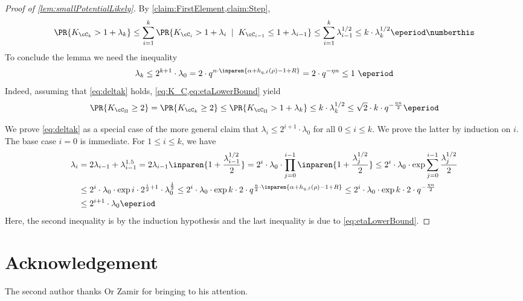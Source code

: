 \documentclass[11pt]{article}
\begin{document}
\begin{proof}[Proof of \cref{lem:smallPotentialLikely}]
    By \cref{claim:FirstElement,claim:Step},
    \begin{align*}
        \PR{K_{\cC_k} > 1+\lambda_k} \le \sum_{i=1}^k \PR{K_{\cC_i} > 1+\lambda _i \;\mid\; K_{\cC_{i-1}}\le 1+\lambda_{i-1}} \le \sum_{i=1}^k \lambda_{i-1}^{1/2} \le k\cdot \lambda_k^{1/2}\eperiod \numberthis \label{eq:K_C}
    \end{align*}
    To conclude the lemma we need the inequality
    \begin{equation}\label{eq:deltak}
        \lambda_k \le 2^{k+1}\cdot \lambda_0 = 2\cdot q^{n\cdot\inparen{\alpha + h_{q,\ell}(\rho)-1+R}} = 2 \cdot q^{-\eta n}\le 1\ \eperiod
    \end{equation}
    Indeed, assuming that \cref{eq:deltak} holds, \cref{eq:K_C,eq:etaLowerBound} yield
    $$\PR{K_{\cC_\Pi} \ge 2} = \PR{K_{\cC_k} \ge 2} \le \PR{K_{\cC_\Pi} > 1+\lambda_k} \le k\cdot \lambda_k^{1/2} \le \sqrt2\cdot k\cdot q^{-\frac {\eta n}2}\eperiod$$
    
    We prove \cref{eq:deltak} as a special case of the more general claim that $\lambda_i \le 2^{i+1}\cdot \lambda_0$ for all $0\le i\le k$. We prove the latter by induction on $i$. The base case $i=0$ is immediate. For $1\le i\le k$, we have
    \begin{align*}\lambda_i &= 2\lambda_{i-1} + \lambda_{i-1}^{1.5} = 2\lambda_{i-1}\inparen{1 + \frac{\lambda_{i-1}^{1/2}}{2}} = 2^i\cdot \lambda_0\cdot\prod_{j=0}^{i-1}\inparen{1+\frac{\lambda_j^{1/2}}2} \leq 2^i\cdot \lambda_0\cdot \exp{\sum_{j=0}^{i-1} \frac{\lambda_j^{1/2}}2} \\
    &\le 2^i\cdot \lambda_0\cdot \exp{i\cdot 2^{\frac {i}{2}+1}\cdot \lambda_0^{\frac 12}} \le 2^i\cdot \lambda_0\cdot \exp{k\cdot 2\cdot q^{\frac n2\cdot \inparen{\alpha+h_{q,\ell}(\rho)-1+R}}}\le 2^i\cdot \lambda_0\cdot \exp{k\cdot 2\cdot q^{-\frac{\eta n}2}}\\&\le 2^{i+1}\cdot \lambda_0\eperiod
    \end{align*}
        Here, the second inequality is by the induction hypothesis and the last inequality is due to \cref{eq:etaLowerBound}.     
\end{proof}

    \ifauthors
    \section{Acknowledgement}
    The second author thanks Or Zamir for bringing \cite{AL2013} to his attention.
    \fi


	
\printbibliography
\end{document}
